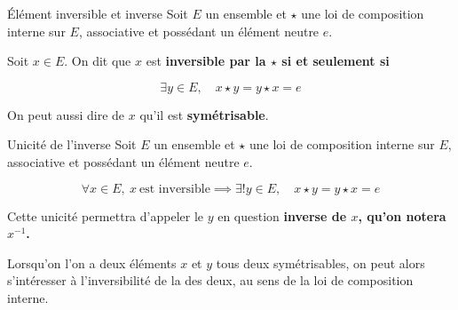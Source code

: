 \documentclass[a4paper,french,bookmarks]{article}
\begin{document}

\begin{definition}{Élément inversible et inverse}{}
    Soit $E$ un ensemble et $\star$ une loi de composition interne sur $E$, associative et possédant un élément neutre $e$.
    
    Soit $x \in E$. On dit que $x$ est \bf{inversible} par la $\star$ si et seulement si
    
    \[\exists y \in E,\quad x\star y = y\star x = e \]
    
\end{definition}

On peut aussi dire de $x$ qu'il est \textbf{symétrisable}.

\begin{property}{Unicité de l'inverse}{}
     Soit $E$ un ensemble et $\star$ une loi de composition interne sur $E$, associative et possédant un élément neutre $e$.
     
     \[ \forall x \in E,\ x \ \text{est inversible} \implies \exists! y \in E,\quad x\star y = y\star x = e\]
     
     Cette unicité permettra d'appeler le $y$ en question \bf{inverse} de $x$, qu'on notera $x^{-1}$.
\end{property}


Lorsqu'on l'on a deux éléments $x$ et $y$ tous deux symétrisables, on peut alors s'intéresser à l'inversibilité de la  des deux, au sens de la loi de composition interne.
\end{document}
